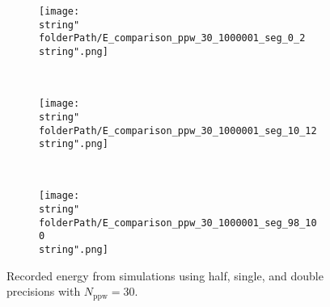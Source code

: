 \begin{minipage}[t]{.5\textwidth}
%
\begin{figure}[H]
\captionsetup{width=0.95\textwidth,font=footnotesize,labelfont=footnotesize}
\centering
%
\begin{subfigure}[b]{1\textwidth}
%
\centering\texttt{[image: \\string"\\folderPath/E\_comparison\_ppw\_30\_1000001\_seg\_0\_2\\string".png]}
%
\end{subfigure}\hfill
\\[2ex]
%
\begin{subfigure}[b]{1\textwidth}
%
\centering\texttt{[image: \\string"\\folderPath/E\_comparison\_ppw\_30\_1000001\_seg\_10\_12\\string".png]}
%
\end{subfigure}\hfill
\\[2ex]
%
\begin{subfigure}[b]{1\textwidth}
%
\centering\texttt{[image: \\string"\\folderPath/E\_comparison\_ppw\_30\_1000001\_seg\_98\_100\\string".png]}
%
\end{subfigure}\hfill
%
\caption{Recorded energy from simulations using half, single, and double precisions with $N_\text{ppw}=30$.}
\label{comparison_E_half_naive_segments_D_3_dt_dx_3_ppw_30}
\end{figure}
%
\end{minipage}


\renewcommand{\folderPath}{\string"/dev/null\string"}